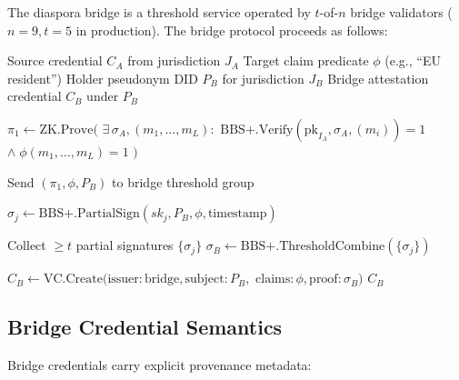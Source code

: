 \documentclass[11pt,a4paper]{article}
\begin{document}
The diaspora bridge is a threshold service operated by $t$-of-$n$ bridge validators
($n = 9, t = 5$ in production). The bridge protocol proceeds as follows:

\begin{algorithm}[H]
\caption{Diaspora Bridge Attestation}
\label{alg:bridge}
\begin{algorithmic}[1]
\Require Source credential $C_A$ from jurisdiction $J_A$
\Require Target claim predicate $\phi$ (e.g., ``EU resident'')
\Require Holder pseudonym DID $P_B$ for jurisdiction $J_B$
\Ensure Bridge attestation credential $C_B$ under $P_B$

    \State {}
    \State $\pi_1 \gets \text{ZK.Prove}($
    \State \quad $\exists\, \sigma_A, (m_1, \ldots, m_L):$
    \State \quad \quad $\text{BBS+.Verify}(\text{pk}_{I_A}, \sigma_A, (m_i)) = 1$
    \State \quad \quad $\wedge\; \phi(m_1, \ldots, m_L) = 1$
    \State \quad $)$

    \State {}
    \State Send $(\pi_1, \phi, P_B)$ to bridge threshold group

    \State {}
            \State $\sigma_j \gets \text{BBS+.PartialSign}(sk_j, P_B, \phi, \text{timestamp})$
        \EndIf
    \EndFor

    \State {}
    \State Collect $\geq t$ partial signatures $\{\sigma_j\}$
    \State $\sigma_B \gets \text{BBS+.ThresholdCombine}(\{\sigma_j\})$

    \State {}
    \State $C_B \gets \text{VC.Create}(\text{issuer}: \text{bridge}, \text{subject}: P_B,$
    \State \quad $\text{claims}: \phi, \text{proof}: \sigma_B)$
    \Return $C_B$
\EndFunction
\end{algorithmic}
\end{algorithm}

\subsection{Bridge Credential Semantics}

Bridge credentials carry explicit provenance metadata:
\end{document}
